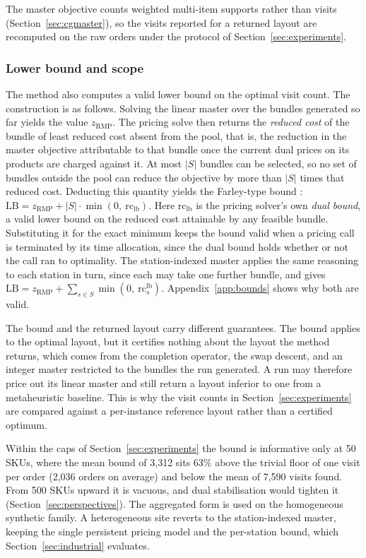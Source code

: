 \documentclass[]{interact}
\begin{document}
The master objective counts weighted multi-item supports rather than visits (Section~\ref{sec:cgmaster}), so the visits reported for a returned layout are recomputed on the raw orders under the protocol of Section~\ref{sec:experiments}.

\subsubsection{Lower bound and scope}\label{sec:cgbound}
The method also computes a valid lower bound on the optimal visit count. The construction is as follows. Solving the linear master over the bundles generated so far yields the value $z_{\mathrm{RMP}}$. The pricing solve then returns the \emph{reduced cost} of the bundle of least reduced cost absent from the pool, that is, the reduction in the master objective attributable to that bundle once the current dual prices on its products are charged against it. At most $|S|$ bundles can be selected, so no set of bundles outside the pool can reduce the objective by more than $|S|$ times that reduced cost. Deducting this quantity yields the Farley-type bound \citep{farley1990note}: $\mathrm{LB} = z_{\mathrm{RMP}} + |S|\cdot \min(0,\ \mathrm{rc}_{\mathrm{lb}})$. Here $\mathrm{rc}_{\mathrm{lb}}$ is the pricing solver's own \emph{dual bound}, a valid lower bound on the reduced cost attainable by any feasible bundle. Substituting it for the exact minimum keeps the bound valid when a pricing call is terminated by its time allocation, since the dual bound holds whether or not the call ran to optimality. The station-indexed master applies the same reasoning to each station in turn, since each may take one further bundle, and gives $\mathrm{LB} = z_{\mathrm{RMP}} + \sum_{s \in S} \min(0,\ \mathrm{rc}^{\mathrm{lb}}_s)$. Appendix~\ref{app:bounds} shows why both are valid.

The bound and the returned layout carry different guarantees. The bound applies to the optimal layout, but it certifies nothing about the layout the method returns, which comes from the completion operator, the swap descent, and an integer master restricted to the bundles the run generated. A run may therefore price out its linear master and still return a layout inferior to one from a metaheuristic baseline. This is why the visit counts in Section~\ref{sec:experiments} are compared against a per-instance reference layout rather than a certified optimum.

Within the caps of Section~\ref{sec:experiments} the bound is informative only at 50 SKUs, where the mean bound of 3,312 sits 63\% above the trivial floor of one visit per order (2,036 orders on average) and below the mean of 7,590 visits found. From 500 SKUs upward it is vacuous, and dual stabilisation would tighten it (Section~\ref{sec:perspectives}). The aggregated form is used on the homogeneous synthetic family. A heterogeneous site reverts to the station-indexed master, keeping the single persistent pricing model and the per-station bound, which Section~\ref{sec:industrial} evaluates.
\end{document}
